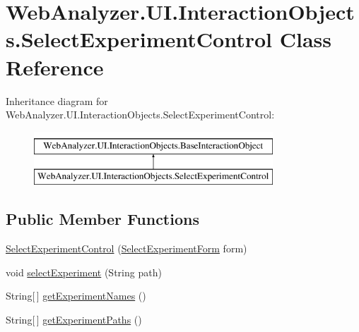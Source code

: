 \hypertarget{class_web_analyzer_1_1_u_i_1_1_interaction_objects_1_1_select_experiment_control}{}\section{Web\+Analyzer.\+U\+I.\+Interaction\+Objects.\+Select\+Experiment\+Control Class Reference}
\label{class_web_analyzer_1_1_u_i_1_1_interaction_objects_1_1_select_experiment_control}
Inheritance diagram for Web\+Analyzer.\+U\+I.\+Interaction\+Objects.\+Select\+Experiment\+Control\+:\begin{figure}[H]
\begin{center}
\leavevmode
\includegraphics[height=2.000000cm]{class_web_analyzer_1_1_u_i_1_1_interaction_objects_1_1_select_experiment_control}
\end{center}
\end{figure}
\subsection*{Public Member Functions}
\begin{DoxyCompactItemize}
\item 
\hyperlink{class_web_analyzer_1_1_u_i_1_1_interaction_objects_1_1_select_experiment_control_a0ec8c7149c5fc197768a0def5c1cf3ab}{Select\+Experiment\+Control} (\hyperlink{class_web_analyzer_1_1_u_i_1_1_select_experiment_form}{Select\+Experiment\+Form} form)
\item 
void \hyperlink{class_web_analyzer_1_1_u_i_1_1_interaction_objects_1_1_select_experiment_control_a1bf6dae0d6ce2c7c6dcf63dfe72e7d58}{select\+Experiment} (String path)
\item 
String\mbox{[}$\,$\mbox{]} \hyperlink{class_web_analyzer_1_1_u_i_1_1_interaction_objects_1_1_select_experiment_control_aa7dda6b33c3fa7d8f154af6722ed61e9}{get\+Experiment\+Names} ()
\item 
String\mbox{[}$\,$\mbox{]} \hyperlink{class_web_analyzer_1_1_u_i_1_1_interaction_objects_1_1_select_experiment_control_a51d3afa57c307c296f8a2ed27a0f106c}{get\+Experiment\+Paths} ()
\end{DoxyCompactItemize}
